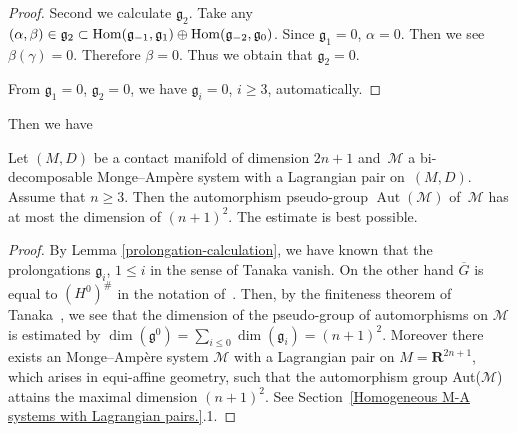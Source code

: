 \begin{proof}
Second we calculate ${\mathfrak g}_2$. Take any $(\alpha, \beta) \in {\mathfrak g}_2 \subset
{\rm Hom}({\mathfrak g}_{-1}, {\mathfrak g}_{1})\oplus
{\rm Hom}({\mathfrak g}_{-2}, {\mathfrak g}_{0})$.
Since ${\mathfrak g}_{1} = 0$, $\alpha = 0$. Then we see $\beta(\gamma) = 0$. Therefore $\beta = 0$.
Thus we obtain that ${\mathfrak g}_{2} = 0$.

From ${\mathfrak g}_{1} = 0$, ${\mathfrak g}_{2} = 0$, we have ${\mathfrak g}_{i} = 0$, $i \geq 3$, automatically.
\end{proof}

Then we have

\begin{Th}
\label{maximal symmetry}
Let $(M, D)$ be a contact manifold of dimension $2n+1$
and~$\mathcal{M}$
a bi-decomposable Monge--Amp{\`e}re system
with a Lagrangian pair on~$(M,D)$.
Assume that $n \geq 3$.
Then the automorphism pseudo-group $\operatorname{Aut}(\mathcal{M})$
of~$\mathcal{M}$ has
at most the dimension of
$(n+1)^2$. The estimate is best possible.
\end{Th}

\begin{proof}
By Lemma \ref{prolongation-calculation},
we have known that the prolongations ${\mathfrak g}_i$, $1 \leq i$ in the sense of Tanaka vanish.
On the other hand $\overline{G}$ is equal to $(H^0)^{\#}$ in the notation of~\cite{Tan}.
Then, by the f\/initeness theorem of Tanaka~\cite[Corollary~2]{Tan}, we see that
the dimension of the pseudo-group of automorphisms on ${\mathcal M}$ is estimated by
$\dim({\mathfrak g^0}) = \sum\limits_{i \leq 0} \dim({\mathfrak g}_i) = (n+1)^2$.
Moreover there exists an Monge--Amp{\`e}re system $\mathcal{M}$ with a Lagrangian pair on
$M = {\mathbf{R}}^{2n+1}$, which arises in equi-af\/f\/ine geometry, such that
the automorphism group {\rm Aut}($\mathcal{M}$) attains the maximal dimension $(n+1)^2$.
See Section~\ref{Homogeneous M-A systems with Lagrangian pairs.}.1.
\end{proof}
